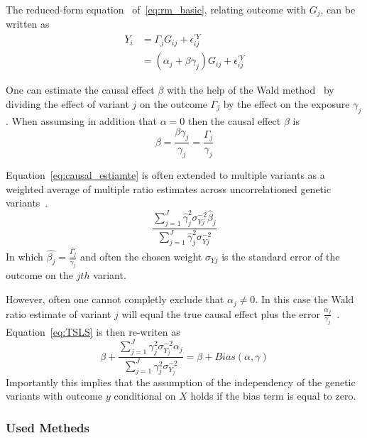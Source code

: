 The reduced-form equation~\cite{Bowden2015} of~\ref{eq:rm_basic}, relating outcome with $G_j$, can be written as
\begin{equation}
	\begin{split}
		Y_i &= \Gamma_j G_{ij} + \epsilon_{ij}^{'Y} \\
		&= (\alpha_j + \beta\gamma_j)G_{ij} + \epsilon_{ij}^{'Y}
	\end{split}
\end{equation}

One can estimate the causal effect $\beta$ with the help of the Wald method~\cite{Wald1940}
by dividing the effect of variant $j$ on the outcome $\Gamma_j$ by the effect on the exposure $\gamma_j$.
When assumsing in addition that $\alpha=0$ then the causal effect $\beta$ is
\begin{equation} \label{eq:causal_estiamte}
	\beta = \frac{\beta\gamma_j}{\gamma_j}= \frac{\Gamma_j}{\gamma_j}
\end{equation}

Equation~\ref{eq:causal_estiamte} is often extended to multiple variants as a weighted average of multiple ratio estimates across uncorrelationed genetic variants~\cite{Bowden2015}.
\begin{equation} \label{eq:IVW}
  \frac{\sum^J_{j=1} \hat{\gamma}_j^2\sigma_{Yj}^{-2} \hat{\beta}_j}
  {\sum^J_{j=1} \hat{\gamma}_j^2\sigma_{Yj}^{-2}}
\end{equation}
In which $\hat{\beta_j} = \frac{\hat{\Gamma_j}}{\hat{\gamma_j}}$ and often the chosen weight $\sigma_{Yj}$ is the standard error of the outcome on the $jth$ variant.

However, often one cannot completly exclude that $\alpha_j \neq 0$.
In this case the Wald ratio estimate of variant $j$ will equal the true causal effect plus the error $\frac{\alpha_j}{\gamma_j}$~\cite{Bowden2015}. 
Equation~\ref{eq:TSLS} is then re-writen as
\begin{equation} \label{eq:TSLSbias}
  \beta + \frac{\sum^J_{j=1} \gamma_j^2\sigma_{Y_j}^{-2} \alpha_j}
  {\sum^J_{j=1} \gamma_j^2\sigma_{Y_j}^{-2}} = \beta + Bias(\alpha, \gamma)
\end{equation}
Importantly this implies that the assumption of the independency of the genetic variants with outcome $y$ conditional on $X$ holds if the bias term is equal to zero.

\subsubsection{Used Metheds}
\label{ssub:Used_Metheds}

